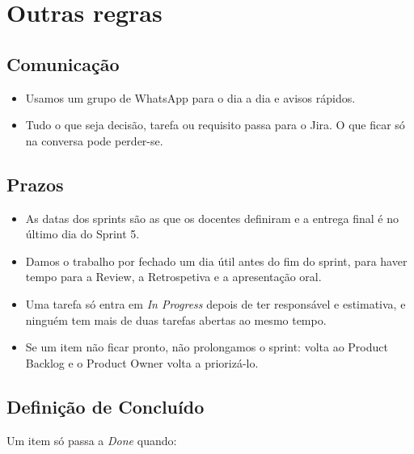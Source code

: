 \documentclass[11pt,a4paper]{article}
\begin{document}
\section{Outras regras}

\subsection{Comunicação}

\begin{itemize}
  \item Usamos um grupo de WhatsApp para o dia a dia e avisos rápidos.
  \item Tudo o que seja decisão, tarefa ou requisito passa para o Jira. O que ficar só na conversa pode perder-se.
\end{itemize}

\subsection{Prazos}

\begin{itemize}
  \item As datas dos sprints são as que os docentes definiram e a entrega final é no último dia do Sprint 5.
  \item Damos o trabalho por fechado um dia útil antes do fim do sprint, para haver tempo para a Review, a Retrospetiva e a apresentação oral.
  \item Uma tarefa só entra em \textit{In Progress} depois de ter responsável e estimativa, e ninguém tem mais de duas tarefas abertas ao mesmo tempo.
  \item Se um item não ficar pronto, não prolongamos o sprint: volta ao Product Backlog e o Product Owner volta a priorizá-lo.
\end{itemize}

\subsection{Definição de Concluído}

Um item só passa a \textit{Done} quando:
\end{document}
